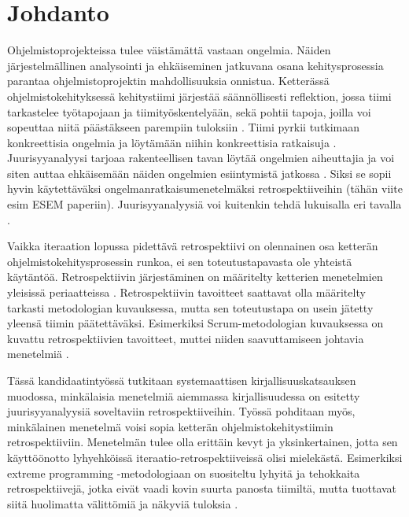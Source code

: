 
\section{Johdanto}

Ohjelmistoprojekteissa tulee väistämättä vastaan ongelmia. Näiden järjestelmällinen analysointi ja ehkäiseminen jatkuvana osana kehitysprosessia parantaa ohjelmistoprojektin mahdollisuuksia onnistua. Ketterässä ohjelmistokehityksessä kehitystiimi järjestää säännöllisesti reflektion, jossa tiimi tarkastelee työtapojaan ja tiimityöskentelyään, sekä pohtii tapoja, joilla voi sopeuttaa niitä päästäkseen parempiin tuloksiin \citep{AgileRetros2006}. Tiimi pyrkii tutkimaan konkreettisia ongelmia ja löytämään niihin konkreettisia ratkaisuja \citep{AgileRetros2006}. Juurisyyanalyysi tarjoaa rakenteellisen tavan löytää ongelmien aiheuttajia ja voi siten auttaa ehkäisemään näiden ongelmien esiintymistä jatkossa \citep{Lehtinen2011}. Siksi se sopii hyvin käytettäväksi ongelmanratkaisumenetelmäksi retrospektiiveihin (tähän viite esim ESEM paperiin). Juurisyyanalyysiä voi kuitenkin tehdä lukuisalla eri tavalla \citep{Lehtinen2011}.

Vaikka iteraation lopussa pidettävä retrospektiivi on olennainen osa ketterän ohjelmistokehitysprosessin runkoa, ei sen toteutustapavasta ole yhteistä käytäntöä. Retrospektiivin järjestäminen on määritelty ketterien menetelmien yleisissä periaatteissa \citep{AgileManifestoPrinciples}. Retrospektiivin tavoitteet saattavat olla määritelty tarkasti metodologian kuvauksessa, mutta sen toteutustapa on usein jätetty yleensä tiimin päätettäväksi. Esimerkiksi Scrum-metodologian kuvauksessa on kuvattu retrospektiivien tavoitteet, muttei niiden saavuttamiseen johtavia menetelmiä \citep{ScrumGuide2011}.

Tässä kandidaatintyössä tutkitaan systemaattisen kirjallisuuskatsauksen \citep{Kitchenham2010} muodossa, minkälaisia menetelmiä aiemmassa kirjallisuudessa on esitetty juurisyyanalyysiä soveltaviin retrospektiiveihin. Työssä pohditaan myös, minkälainen menetelmä voisi sopia ketterän ohjelmistokehitystiimin retrospektiiviin.  Menetelmän tulee olla erittäin kevyt ja yksinkertainen, jotta sen käyttöönotto lyhyehköissä iteraatio-retrospektiiveissä olisi mielekästä. Esimerkiksi extreme programming -metodologiaan on suositeltu lyhyitä ja tehokkaita retrospektiivejä, jotka eivät vaadi kovin suurta panosta tiimiltä, mutta tuottavat siitä huolimatta välittömiä ja näkyviä tuloksia \citep{myllyaho2004review}.

